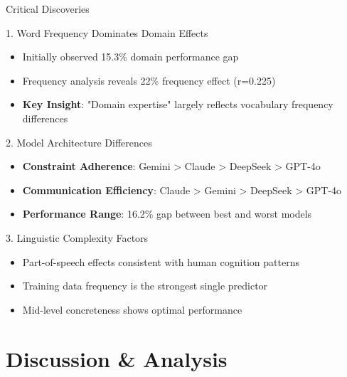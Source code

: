 \documentclass[aspectratio=169]{beamer}
\begin{document}
\begin{frame}{Critical Discoveries}
\begin{block}{1. Word Frequency Dominates Domain Effects}
\begin{itemize}
    \item Initially observed 15.3\% domain performance gap
    \item Frequency analysis reveals 22\% frequency effect (r=0.225)
    \item \textbf{Key Insight}: "Domain expertise" largely reflects vocabulary frequency differences
\end{itemize}
\end{block}

\begin{block}{2. Model Architecture Differences}
\begin{itemize}
    \item \textbf{Constraint Adherence}: Gemini > Claude > DeepSeek > GPT-4o
    \item \textbf{Communication Efficiency}: Claude > Gemini > DeepSeek > GPT-4o
    \item \textbf{Performance Range}: 16.2\% gap between best and worst models
\end{itemize}
\end{block}

\begin{block}{3. Linguistic Complexity Factors}
\begin{itemize}
    \item Part-of-speech effects consistent with human cognition patterns
    \item Training data frequency is the strongest single predictor
    \item Mid-level concreteness shows optimal performance
\end{itemize}
\end{block}
\end{frame}

\section{Discussion \& Analysis}
\end{document}
